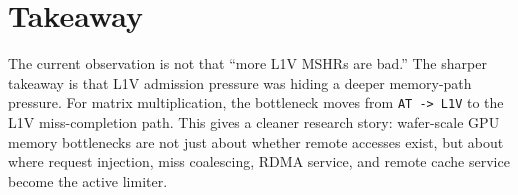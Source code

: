 \documentclass[sigconf,screen,review]{acmart}
\begin{document}
\section{Takeaway}

The current observation is not that ``more L1V MSHRs are bad.''  The sharper
takeaway is that L1V admission pressure was hiding a deeper memory-path
pressure.  For matrix multiplication, the bottleneck moves from
\texttt{AT -> L1V} to the L1V miss-completion path.  This gives a cleaner
research story: wafer-scale GPU memory bottlenecks are not just about whether
remote accesses exist, but about where request injection, miss coalescing, RDMA
service, and remote cache service become the active limiter.

\balance
\end{document}
